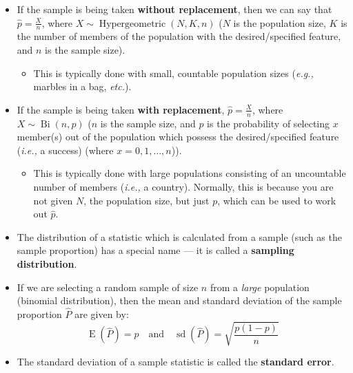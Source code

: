 \documentclass[12pt,a4paper,titlepage]{article}
\DeclareMathOperator{\E}{E}
\DeclareMathOperator{\sd}{sd}
\DeclareMathOperator{\Bi}{Bi}
\DeclareMathOperator{\Hypergeometric}{Hypergeometric}
\begin{document}
            \begin{SummaryBox}[title=Types of distributions for calculating \texorpdfstring{$\bm{\hat{p}}$}{\^p}, list text=Types of distributions for calculating $\hat{p}$]
                \begin{itemize}
                    \item If the sample is being taken \textbf{without replacement}, then we can say that $\hat{p} = \frac{X}{n}$, where $X \sim \Hypergeometric(N,K,n)$ ($N$ is the population size, $K$ is the number of members of the population with the desired/specified feature, and $n$ is the sample size).
                    \begin{itemize}[topsep=0pt]
                        \item This is typically done with small, countable population sizes (\textit{e.g.,} marbles in a bag, \textit{etc.}).
                    \end{itemize}
                    \item If the sample is being taken \textbf{with replacement}, $\hat{p} = \frac{X}{n}$, where $X \sim \Bi(n,p)$ ($n$ is the sample size, and $p$ is the probability of selecting $x$ member(s) out of the population which possess the desired/specified feature (\textit{i.e.,} a success) (where $x=0,1,\dots,n$)).
                    \begin{itemize}[topsep=0pt]
                        \item This is typically done with large populations consisting of an uncountable number of members (\textit{i.e.,} a country). Normally, this is because you are not given $N$, the population size, but just $p$, which can be used to work out $\hat{p}$.
                    \end{itemize}
                    \item The distribution of a statistic which is calculated from a sample (such as the sample proportion) has a special name --- it is called a \textbf{sampling distribution}.
                \end{itemize}
            \end{SummaryBox}
            
            \begin{SummaryBox}[title=Population parameters for the sample]
                \begin{itemize}[leftmargin=*]
                    \item If we are selecting a random sample of size $n$ from a \textit{large} population (binomial distribution), then the mean and standard deviation of the sample proportion $\hat{P}$ are given by:
                    \[
                        \E(\hat{P}) = p \quad \text{and} \quad \sd(\hat{P}) = \sqrt{ \frac{p(1-p)}{n} }
                    \]
                    \item The standard deviation of a sample statistic is called the \textbf{standard error}.
                \end{itemize}
            \end{SummaryBox}
            
\end{document}
